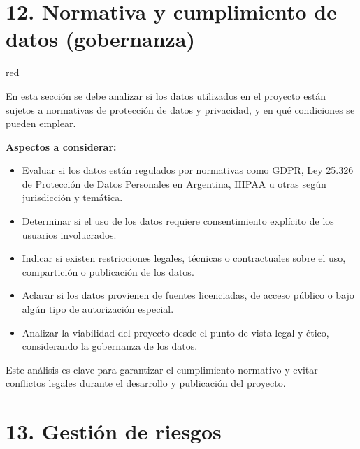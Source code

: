 \documentclass[
11pt, %
]{charter}
\begin{document}
\section{12. Normativa y cumplimiento de datos (gobernanza)}

\begin{consigna}{red} %

En esta sección se debe analizar si los datos utilizados en el proyecto están sujetos a normativas de protección de datos y privacidad, y en qué condiciones se pueden emplear.

\textbf{Aspectos a considerar:}
\begin{itemize}
  \item Evaluar si los datos están regulados por normativas como GDPR, Ley 25.326 de Protección de Datos Personales en Argentina, HIPAA u otras según jurisdicción y temática.
  \item Determinar si el uso de los datos requiere consentimiento explícito de los usuarios involucrados.
  \item Indicar si existen restricciones legales, técnicas o contractuales sobre el uso, compartición o publicación de los datos.
  \item Aclarar si los datos provienen de fuentes licenciadas, de acceso público o bajo algún tipo de autorización especial.
  \item Analizar la viabilidad del proyecto desde el punto de vista legal y ético, considerando la gobernanza de los datos.
\end{itemize}

Este análisis es clave para garantizar el cumplimiento normativo y evitar conflictos legales durante el desarrollo y publicación del proyecto.

\end{consigna} %

\section{13. Gestión de riesgos}
\label{sec:riesgos}
\end{document}
